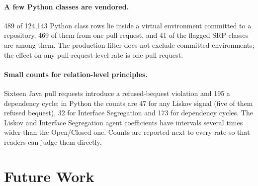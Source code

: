 \paragraph{A few Python classes are vendored.} 489 of 124{,}143 Python class rows lie inside a virtual
environment committed to a repository, 469 of them from one pull request, and 41 of the flagged SRP
classes are among them. The production filter does not exclude committed environments; the effect on
any pull-request-level rate is one pull request.

\paragraph{Small counts for relation-level principles.} Sixteen Java pull requests introduce a
refused-bequest violation and 195 a dependency cycle; in Python the counts are 47 for any Liskov
signal (five of them refused bequest), 32 for Interface Segregation and 173 for dependency cycles. The Liskov and Interface Segregation agent coefficients
have intervals several times wider than the Open/Closed one. Counts are reported next to every rate so
that readers can judge them directly.

\section{Future Work}
\label{sec:future-work}

